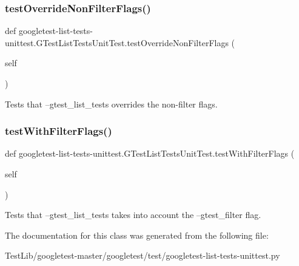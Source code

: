 \subsubsection{\texorpdfstring{test\+Override\+Non\+Filter\+Flags()}{testOverrideNonFilterFlags()}}
{\footnotesize\ttfamily def googletest-\/list-\/tests-\/unittest.\+G\+Test\+List\+Tests\+Unit\+Test.\+test\+Override\+Non\+Filter\+Flags (\begin{DoxyParamCaption}\item[{}]{self }\end{DoxyParamCaption})}

\begin{DoxyVerb}Tests that --gtest_list_tests overrides the non-filter flags.\end{DoxyVerb}
 \mbox{\label{classgoogletest-list-tests-unittest_1_1GTestListTestsUnitTest_adb60d2295fee8ed4af2a5ee1a32e5778}} 
\subsubsection{\texorpdfstring{test\+With\+Filter\+Flags()}{testWithFilterFlags()}}
{\footnotesize\ttfamily def googletest-\/list-\/tests-\/unittest.\+G\+Test\+List\+Tests\+Unit\+Test.\+test\+With\+Filter\+Flags (\begin{DoxyParamCaption}\item[{}]{self }\end{DoxyParamCaption})}

\begin{DoxyVerb}Tests that --gtest_list_tests takes into account the
--gtest_filter flag.\end{DoxyVerb}
 

The documentation for this class was generated from the following file\+:\begin{DoxyCompactItemize}
\item 
Test\+Lib/googletest-\/master/googletest/test/googletest-\/list-\/tests-\/unittest.\+py\end{DoxyCompactItemize}
